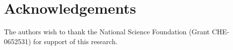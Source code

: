 \section{Acknowledgements}

The authors wish to thank the National Science Foundation (Grant CHE-0652531) for support of this research.
